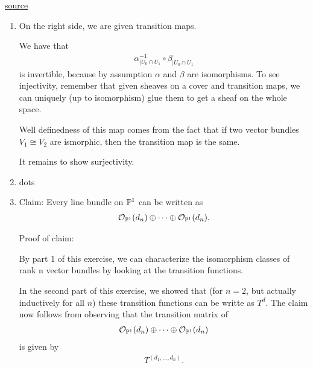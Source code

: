 \newcommand{\sheet}{8}




\maketitle{}

\begin{exercise}{2}
    
    \href{http://math.uchicago.edu/~may/REU2021/REUPapers/Davidovsky.pdf}{source}
    \begin{enumerate}
        \item On the right side, we are given transition maps. 
        
        We have that
        \begin{align*}
            \alpha_{| U_0\cap U_1}^{-1} \circ \beta_{| U_0\cap U_1}
        \end{align*}
        is invertible, because by assumption $\alpha$ and $\beta$ are isomorphisms. 
        To see injectivity, remember that given sheaves on a cover and transition maps,
        we can uniquely (up to isomorphism) glue them to get a sheaf on the whole space.

        Well definedness of this map comes from the fact that if two vector bundles 
        $V_1\cong V_2$ are ismorphic, then the transition map is the same.

        It remains to show surjectivity.
        
        \item dots
        \item 
        Claim: Every line bundle on $\mathbb{P}^1$ can be written as 
        \begin{align*}
            \mathcal{O}_{\mathbb{P}^1}(d_n)\oplus \dots \oplus \mathcal{O}_{\mathbb{P} ^1}(d_n).
        \end{align*}
        
        Proof of claim:

        By part 1 of this exercise, we can characterize the isomorphism classes of rank n vector bundles by looking at the transition functions. 

        In the second part of this exercise, we showed that (for $n=2$, but actually inductively for all $n$) these 
        transition functions can be writte as $T^d$. The claim now follows from observing that the transition matrix of 
        \begin{align*}
            \mathcal{O}_{\mathbb{P}^1}(d_n)\oplus \dots \oplus \mathcal{O}_{\mathbb{P} ^1}(d_n)
        \end{align*}
        is given by
        \begin{align*}
            T^{(d_1,\dots, d_n)}.
        \end{align*}
    \end{enumerate}
\end{exercise}


